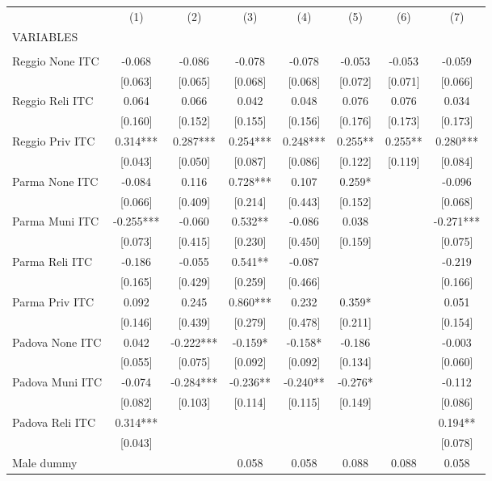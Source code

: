 \begin{tabular}{lccccccc} \hline
 & (1) & (2) & (3) & (4) & (5) & (6) & (7) \\
VARIABLES &  &  &  &  &  &  &  \\ \hline
 &  &  &  &  &  &  &  \\
Reggio None ITC & -0.068 & -0.086 & -0.078 & -0.078 & -0.053 & -0.053 & -0.059 \\
 & [0.063] & [0.065] & [0.068] & [0.068] & [0.072] & [0.071] & [0.066] \\
Reggio Reli ITC & 0.064 & 0.066 & 0.042 & 0.048 & 0.076 & 0.076 & 0.034 \\
 & [0.160] & [0.152] & [0.155] & [0.156] & [0.176] & [0.173] & [0.173] \\
Reggio Priv ITC & 0.314*** & 0.287*** & 0.254*** & 0.248*** & 0.255** & 0.255** & 0.280*** \\
 & [0.043] & [0.050] & [0.087] & [0.086] & [0.122] & [0.119] & [0.084] \\
Parma None ITC & -0.084 & 0.116 & 0.728*** & 0.107 & 0.259* &  & -0.096 \\
 & [0.066] & [0.409] & [0.214] & [0.443] & [0.152] &  & [0.068] \\
Parma Muni ITC & -0.255*** & -0.060 & 0.532** & -0.086 & 0.038 &  & -0.271*** \\
 & [0.073] & [0.415] & [0.230] & [0.450] & [0.159] &  & [0.075] \\
Parma Reli ITC & -0.186 & -0.055 & 0.541** & -0.087 &  &  & -0.219 \\
 & [0.165] & [0.429] & [0.259] & [0.466] &  &  & [0.166] \\
Parma Priv ITC & 0.092 & 0.245 & 0.860*** & 0.232 & 0.359* &  & 0.051 \\
 & [0.146] & [0.439] & [0.279] & [0.478] & [0.211] &  & [0.154] \\
Padova None ITC & 0.042 & -0.222*** & -0.159* & -0.158* & -0.186 &  & -0.003 \\
 & [0.055] & [0.075] & [0.092] & [0.092] & [0.134] &  & [0.060] \\
Padova Muni ITC & -0.074 & -0.284*** & -0.236** & -0.240** & -0.276* &  & -0.112 \\
 & [0.082] & [0.103] & [0.114] & [0.115] & [0.149] &  & [0.086] \\
Padova Reli ITC & 0.314*** &  &  &  &  &  & 0.194** \\
 & [0.043] &  &  &  &  &  & [0.078] \\
Male dummy &  &  & 0.058 & 0.058 & 0.088 & 0.088 & 0.058 \\

\end{tabular}
